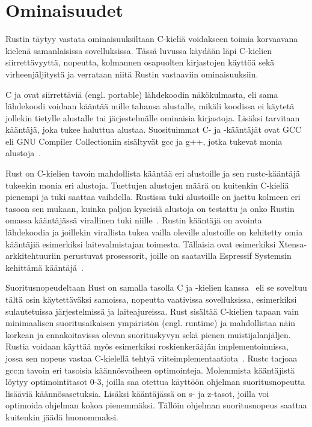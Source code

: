 \section{Ominaisuudet}
Rustin täytyy vastata ominaisuuksiltaan C-kieliä voidakseen toimia korvaavana kielenä samanlaisissa sovelluksissa. Tässä luvussa käydään läpi C-kielien siirrettävyyttä, nopeutta, kolmannen osapuolten kirjastojen käyttöä sekä virheenjäljitystä ja verrataan niitä Rustin vastaaviin ominaisuuksiin.

C ja \Cpp ovat siirrettäviä (engl. portable) lähdekoodin näkökulmasta, eli sama lähdekoodi voidaan kääntää mille tahansa alustalle, mikäli koodissa ei käytetä jollekin tietylle alustalle tai järjestelmälle ominaisia kirjastoja. Lisäksi tarvitaan kääntäjä, joka tukee haluttua alustaa. Suosituimmat C- ja \Cpp-kääntäjät ovat GCC eli GNU Compiler Collectioniin sisältyvät gcc ja g++, jotka tukevat monia alustoja~\cite{gcctarget}.

Rust on C-kielien tavoin mahdollista kääntää eri alustoille ja sen rustc-kääntäjä tukeekin monia eri alustoja. Tuettujen alustojen määrä on kuitenkin C-kieliä pienempi ja tuki saattaa vaihdella. Rustissa tuki alustoille on jaettu kolmeen eri tasoon sen mukaan, kuinka paljon kyseisiä alustoja on testattu ja onko Rustin omassa kääntäjässä virallinen tuki niille~\cite{rustc}. Rustin kääntäjä on avointa lähdekoodia ja joillekin virallista tukea vailla oleville alustoille on kehitetty omia kääntäjiä esimerkiksi laitevalmistajan toimesta. Tällaisia ovat esimerkiksi Xtensa-arkkitehtuuriin perustuvat prosessorit, joille on saatavilla Espressif Systemsin kehittämä kääntäjä~\cite{esprs}.

Suoritusnopeudeltaan Rust on samalla tasolla C ja \Cpp-kielien kanssa~\cite{rustvsc} eli se soveltuu tältä osin käytettäväksi samoissa, nopeutta vaativissa sovelluksissa, esimerkiksi sulautetuissa järjestelmissä ja laiteajureissa. Rust sisältää C-kielien tapaan vain minimaalisen suoritusaikaisen ympäristön (engl. runtime) ja mahdollistaa näin korkean ja ennakoitavissa olevan suorituskyvyn sekä pienen muistijalanjäljen. Rustia voidaan käyttää myös esimerkiksi roskienkerääjän implementoinnissa, jossa sen nopeus vastaa C-kielellä tehtyä viiteimplementaatiota~\cite[p.~94]{rustgc}. Rustc tarjoaa gcc:n tavoin eri tasoisia käännösvaiheen optimointeja. Molemmista kääntäjistä löytyy optimointitasot 0-3, joilla saa otettua käyttöön ohjelman suoritusnopeutta lisääviä käännösasetuksia. Lisäksi kääntäjässä on s- ja z-tasot, joilla voi optimoida ohjelman kokoa pienemmäksi. Tällöin ohjelman suoritusnopeus saattaa kuitenkin jäädä huonommaksi.

